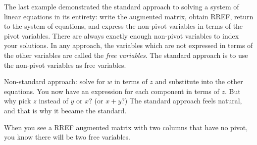 The last example demonstrated the standard approach to solving a system of linear equations in its entirety: write the augmented matrix, obtain RREF, return to the system of equations, and express the non-pivot variables in terms of the pivot variables. 
There are always exactly enough non-pivot variables to index your solutions. 
In any approach, the variables which are not expressed in terms of the other variables are called the {\it free variables}. The standard approach is to use the non-pivot variables as free variables.

Non-standard approach: solve for $w$ in terms of $z$ and substitute into the other equations. You now have an expression for each component in terms of $z$. But why pick $z$ instead of $y$ or $x$? (or $x+y$?) The standard approach feels natural, and that is why it became the standard.

When you see a RREF augmented matrix with two columns that have no pivot, you know there will be two free variables. 

